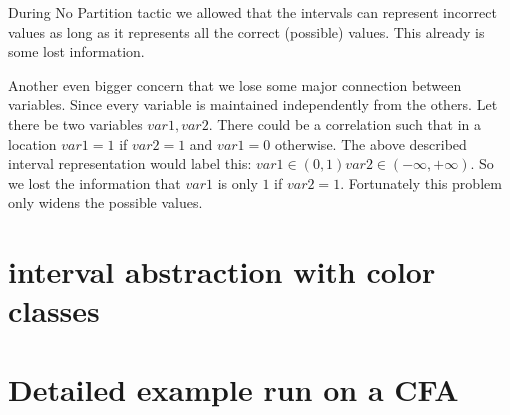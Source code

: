 During No Partition tactic we allowed that the intervals can represent incorrect values as long as it represents all the correct (possible) values. This already is some lost information.

Another even bigger concern that we lose some major connection between variables. Since every variable is maintained independently from the others. Let there be two variables $var1, var2$. There could be a correlation such that in a location $var1=1$ if $var2=1$ and $var1=0$ otherwise. The above described interval representation would label this: $var1 \in (0, 1) var2 \in (-\infty, +\infty)$. So we lost the information that $var1$ is only $1$ if $var2=1$. Fortunately this problem only widens the possible values.

\section{interval abstraction with color classes}


\section{Detailed example run on a CFA}
